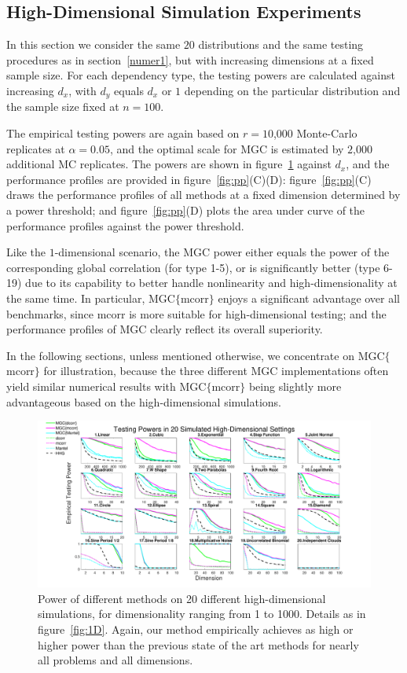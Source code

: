 \documentclass[11pt]{article}
\begin{document}
\subsection{High-Dimensional Simulation Experiments}
\label{numer2}
In this section we consider the same $20$ distributions and the same testing procedures as in section~\ref{numer1}, but with increasing dimensions at a fixed sample size. For each dependency type, the testing powers are calculated against increasing $d_{x}$, with $d_{y}$ equals $d_{x}$ or $1$ depending on the particular distribution and the sample size fixed at $n=100$.

The empirical testing powers are again based on $r=10$,$000$ Monte-Carlo replicates at $\alpha=0.05$, and the optimal scale for MGC is estimated by $2$,$000$ additional MC replicates. The powers are shown in figure~\ref{fig:nD} against $d_{x}$, and the performance profiles are provided in figure~\ref{fig:pp}(C)(D): figure~\ref{fig:pp}(C) draws the performance profiles of all methods at a fixed dimension determined by a power threshold; and figure~\ref{fig:pp}(D) plots the area under curve of the performance profiles against the power threshold.

Like the $1$-dimensional scenario, the MGC power either equals the power of the corresponding global correlation (for type 1-5), or is significantly better (type 6-19) due to its capability to better handle nonlinearity and high-dimensionality at the same time. In particular, MGC$\{$mcorr$\}$ enjoys a significant advantage over all benchmarks, since mcorr is more suitable for high-dimensional testing; and the performance profiles of MGC clearly reflect its overall superiority. 

In the following sections, unless mentioned otherwise, we concentrate on MGC$\{$mcorr$\}$ for illustration, because the three different MGC implementations often yield similar numerical results with MGC$\{$mcorr$\}$ being slightly more advantageous based on the high-dimensional simulations.

\begin{figure}[htbp]
\includegraphics[width=1.0\textwidth]{Figures/Fig5}
\caption{Power of different methods on 20 different high-dimensional simulations, for dimensionality ranging from 1 to 1000.  Details as in figure~\ref{fig:1D}.
Again, our method empirically achieves as high or higher power than the previous state of the art methods for nearly all problems and all dimensions.
}
\label{fig:nD}
\end{figure}
\end{document}
